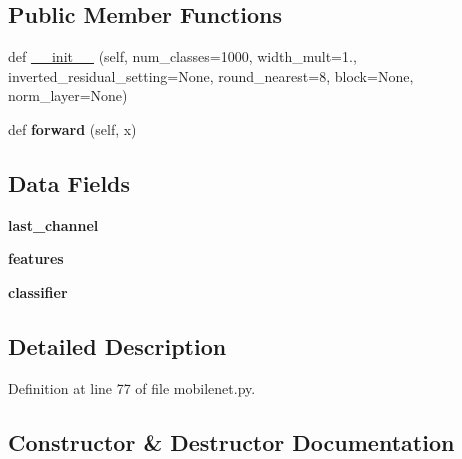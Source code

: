 \subsection*{Public Member Functions}
\begin{DoxyCompactItemize}
\item 
def \hyperlink{classtorchvision_1_1models_1_1mobilenet_1_1MobileNetV2_a4130d3605fc66ed9c745b16421d1cd63}{\+\_\+\+\_\+init\+\_\+\+\_\+} (self, num\+\_\+classes=1000, width\+\_\+mult=1., inverted\+\_\+residual\+\_\+setting=None, round\+\_\+nearest=8, block=None, norm\+\_\+layer=None)
\item 
\mbox{\label{classtorchvision_1_1models_1_1mobilenet_1_1MobileNetV2_a89d340f99f98d46b9e0050cb5643bfc8}} 
def {\bfseries forward} (self, x)
\end{DoxyCompactItemize}
\subsection*{Data Fields}
\begin{DoxyCompactItemize}
\item 
\mbox{\label{classtorchvision_1_1models_1_1mobilenet_1_1MobileNetV2_a467c58ac190bd66ed9751cee290bb15d}} 
{\bfseries last\+\_\+channel}
\item 
\mbox{\label{classtorchvision_1_1models_1_1mobilenet_1_1MobileNetV2_a6c74a161f3e739da5a14d5bd543df763}} 
{\bfseries features}
\item 
\mbox{\label{classtorchvision_1_1models_1_1mobilenet_1_1MobileNetV2_a936727f97212025ab802cb8f62e013aa}} 
{\bfseries classifier}
\end{DoxyCompactItemize}


\subsection{Detailed Description}


Definition at line 77 of file mobilenet.\+py.



\subsection{Constructor \& Destructor Documentation}
\mbox{\label{classtorchvision_1_1models_1_1mobilenet_1_1MobileNetV2_a4130d3605fc66ed9c745b16421d1cd63}} 
